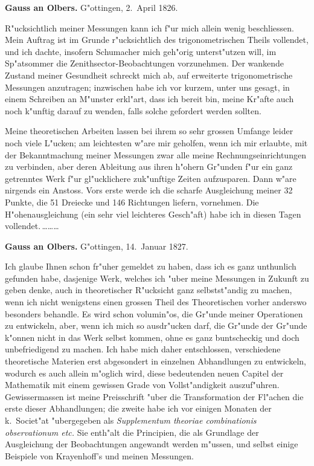 \documentclass[12pt,a4paper]{article}
\theoremstyle{plain}
\theoremstyle{definition}
\theoremstyle{remark}
\begin{document}
\medskip
\noindent \textbf{Gauss an Olbers.} G"ottingen, 2.~April 1826.

\medskip
\noindent R"ucksichtlich meiner Messungen kann ich f"ur mich allein wenig beschliessen. Mein Auftrag ist im Grunde r"ucksichtlich des trigonometrischen Theils vollendet, und ich dachte, insofern Schumacher mich geh"orig unterst"utzen will, im Sp"atsommer die Zenithsector-Beobachtungen vorzunehmen. Der wankende Zustand meiner Gesundheit schreckt mich ab, auf erweiterte trigonometrische Messungen anzutragen; inzwischen habe ich vor kurzem, unter uns gesagt, in einem Schreiben an M"unster erkl"art, dass ich bereit bin, meine Kr"afte auch noch k"unftig darauf zu wenden, falls solche gefordert werden sollten.

Meine theoretischen Arbeiten lassen bei ihrem so sehr grossen Umfange leider noch viele L"ucken; am leichtesten w"are mir geholfen, wenn ich mir erlaubte, mit der Bekanntmachung meiner Messungen zwar alle meine Rechnungseinrichtungen zu verbinden, aber deren Ableitung aus ihren h"ohern Gr"unden f"ur ein ganz getrenntes Werk f"ur gl"ucklichere zuk"unftige Zeiten aufzusparen. Dann w"are nirgends ein Anstoss. Vors erste werde ich die scharfe Ausgleichung meiner 32 Punkte, die 51 Dreiecke und 146 Richtungen liefern, vornehmen. Die H"ohenausgleichung (ein sehr viel leichteres Gesch"aft) habe ich in diesen Tagen vollendet.\,\ldots\ldots\ldots

\newpage
\noindent \textbf{Gauss an Olbers.} G"ottingen, 14.~Januar 1827.

\medskip
\noindent Ich glaube Ihnen schon fr"uher gemeldet zu haben, dass ich es ganz unthunlich gefunden habe, dasjenige Werk, welches ich "uber meine Messungen in Zukunft zu geben denke, auch in theoretischer R"ucksicht ganz selbstst"andig zu machen, wenn ich nicht wenigstens einen grossen Theil des Theoretischen vorher anderswo besonders behandle. Es wird schon volumin"os, die Gr"unde meiner Operationen zu entwickeln, aber, wenn ich mich so ausdr"ucken darf, die Gr"unde der Gr"unde k"onnen nicht in das Werk selbst kommen, ohne es ganz buntscheckig und doch unbefriedigend zu machen. Ich habe mich daher entschlossen, verschiedene theoretische Materien erst abgesondert in einzelnen Abhandlungen zu entwickeln, wodurch es auch allein m"oglich wird, diese bedeutenden neuen Capitel der Mathematik mit einem gewissen Grade von Vollst"andigkeit auszuf"uhren. Gewissermassen ist meine Preisschrift "uber die Transformation der Fl"achen die erste dieser Abhandlungen; die zweite habe ich vor einigen Monaten der k.\ Societ"at "ubergegeben als \emph{Supplementum theoriae combinationis observationum etc.} Sie enth"alt die Principien, die als Grundlage der Ausgleichung der Beobachtungen angewandt werden m"ussen, und selbst einige Beispiele von Krayenhoff's und meinen Messungen.
\end{document}
